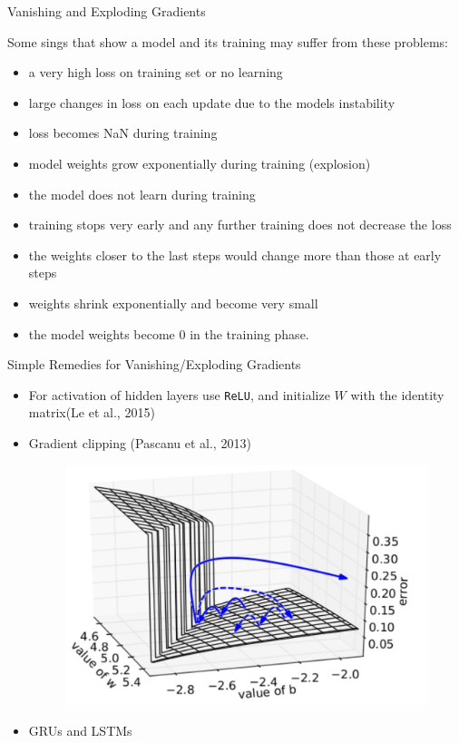 \begin{frame}{Vanishing and Exploding Gradients}
    
Some sings that show a model and its training may suffer from these problems:
        \begin{itemize}
            \item a very high loss on training set or no learning
            \item large changes in loss on each update due to the models instability
            \item loss becomes NaN during training
            \item model weights grow exponentially during training (explosion)
            \item the model does not learn during training
            \item training stops very early and any further training does not decrease the loss
            \item the weights closer to the last steps would  change more than those at early steps
            \item weights shrink exponentially and become very small \item the model weights become 0 in the training phase.
        \end{itemize}
\end{frame}
\begin{frame}{Simple Remedies for Vanishing/Exploding Gradients}
    \begin{itemize}
        \item For activation of hidden layers use \texttt{ReLU}, and initialize $W$ with the identity matrix(Le et al., 2015)
        \item Gradient clipping (Pascanu et al., 2013)
        \begin{figure}
            \centering
            \includegraphics[scale=0.09]{./figure/gradient_clipping.png}
        \end{figure}
        \item GRUs and LSTMs
    \end{itemize}
\end{frame}
